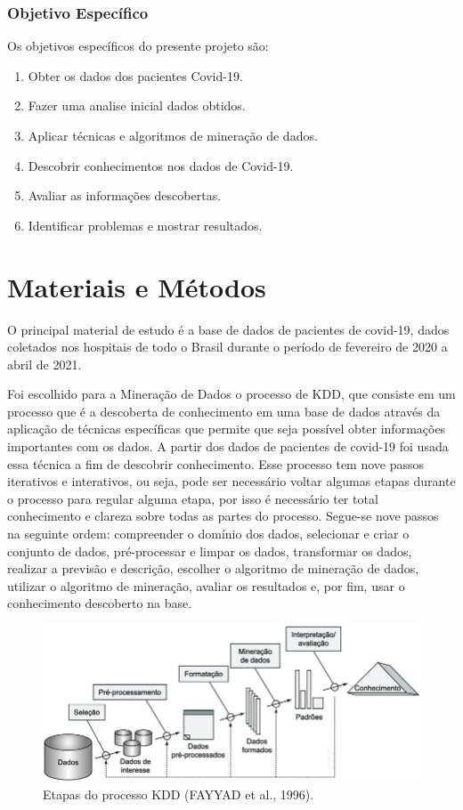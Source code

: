 \documentclass[tcc1]{uftex}
\begin{document}
\subsection*{Objetivo Específico}

Os objetivos específicos do presente projeto são: 
\begin{enumerate}
    \item Obter os dados dos pacientes Covid-19.
	\item Fazer uma analise inicial dados obtidos.
	\item Aplicar técnicas e algoritmos de mineração de dados.
	\item Descobrir conhecimentos nos dados de Covid-19.
	\item Avaliar as informações descobertas.
	\item Identificar problemas e mostrar resultados.
\end{enumerate}


\chapter{Materiais e Métodos}

O principal material de estudo é a base de dados de pacientes de covid-19, dados coletados nos hospitais de todo o Brasil durante o período de fevereiro de 2020 a abril de 2021. 


	Foi escolhido para a Mineração de Dados o processo de KDD, que consiste em um processo que é a descoberta de conhecimento em uma base de dados através da aplicação de técnicas específicas que permite que seja possível obter informações importantes com os dados. A partir dos dados de pacientes de covid-19 foi usada essa técnica a fim de descobrir conhecimento. Esse processo tem nove passos iterativos e interativos, ou seja, pode ser necessário voltar algumas etapas durante o processo para regular alguma etapa, por isso é necessário ter total conhecimento e clareza sobre todas as partes do processo. Segue-se nove passos na seguinte ordem: compreender o domínio dos dados, selecionar e criar o conjunto de dados, pré-processar e limpar os dados, transformar os dados, realizar a previsão e descrição, escolher o algoritmo de mineração de dados, utilizar o algoritmo de mineração, avaliar os resultados e, por fim, usar o conhecimento descoberto na base. \cite{maimon}
    
    \begin{figure}[h]

    \centering
    \includegraphics[width=12cm]{kdd.jpg} %
    \caption{Etapas do processo KDD (FAYYAD et al., 1996).}
    \end{figure}
\end{document}
